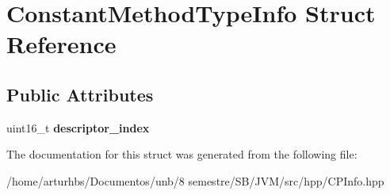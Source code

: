 \hypertarget{structConstantMethodTypeInfo}{}\section{Constant\+Method\+Type\+Info Struct Reference}
\label{structConstantMethodTypeInfo}
\subsection*{Public Attributes}
\begin{DoxyCompactItemize}
\item 
uint16\+\_\+t {\bfseries descriptor\+\_\+index}\hypertarget{structConstantMethodTypeInfo_a2b6ca015e55ccfa9712a5d04132ecfa4}{}\label{structConstantMethodTypeInfo_a2b6ca015e55ccfa9712a5d04132ecfa4}

\end{DoxyCompactItemize}


The documentation for this struct was generated from the following file\+:\begin{DoxyCompactItemize}
\item 
/home/arturhbs/\+Documentos/unb/8 semestre/\+S\+B/\+J\+V\+M/src/hpp/C\+P\+Info.\+hpp\end{DoxyCompactItemize}
